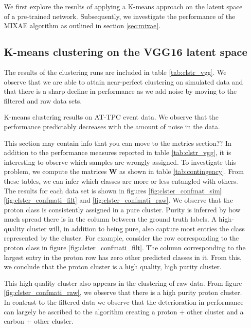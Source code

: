 \documentclass[review,number,sort&compress]{elsarticle}
\begin{document}
We first explore the results of applying a K-means approach on the latent space of a pre-trained network. Subsequently, we investigate the performance of the MIXAE algorithm as outlined in section \ref{sec:mixae}.

\subsection{K-means clustering on the VGG16 latent space}

The results of the clustering runs are included in table \ref{tab:clstr_vgg}. We observe that we are able to attain near-perfect clustering on simulated data and that there is a sharp decline in performance as we add noise by moving to the filtered and raw data sets. 


\begin{table}[H]
\centering 
\caption[K-means on pre-trained model]{K-means clustering results on AT-TPC event data. We observe that the performance predictably decreases with the amount of noise in the data.}\label{tab:clstr_vgg}

\end{table}

{\color{blue} This section may contain info that you can move to the metrics section??}
In addition to the performance measures reported in table \ref{tab:clstr_vgg}, it is interesting to observe which samples are wrongly assigned. To investigate this problem, we compute the matrices $\mathbf{W}$ as shown in table \ref{tab:contingency}. From these tables, we can infer which classes are more or less entangled with others. The results for each data set is shown in figures \ref{fig:clster_confmat_sim} \ref{fig:clster_confmati_filt} and \ref{fig:clster_confmati_raw}. We observe that the proton class is consistently assigned in a pure cluster. Purity is inferred by how much spread there is in the column between the ground truth labels. A high-quality cluster will, in addition to being pure, also capture most entries the class represented by the cluster. For example, consider the row corresponding to the proton class in figure \ref{fig:clster_confmati_filt}. The column corresponding to the largest entry in the proton row has zero other predicted classes in it. From this, we conclude that the proton cluster is a high quality, high purity cluster. 

This high-quality cluster also appears in the clustering of raw data. From figure \ref{fig:clster_confmati_raw}, we observe that there is a high purity proton cluster. In contrast to the filtered data we observe that the deterioration in performance can largely be ascribed to the algorithm creating a proton + other cluster and a carbon + other cluster.
\end{document}
